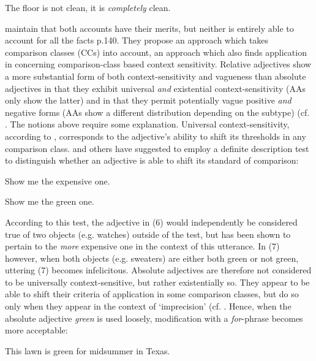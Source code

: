 \documentclass[output=paper
,modfonts
,nonflat]{langsci/langscibook}
\begin{document}
\begin{examples}
	\item The floor is not clean, it is \textit{completely} clean.
\end{examples}

\citet*{Toledo2011} maintain that both accounts have their merits, but neither is entirely able to account for all the facts p.140. They propose an approach which takes comparison classes (CCs) into account, an approach which also finds application in \citet{Burnett2017} concerning comparison-class based context sensitivity.
Relative adjectives show a more substantial form of both context-sensitivity and vagueness than absolute adjectives in that they exhibit universal \textit{and} existential context-sensitivity (AAs only show the latter) and in that they permit potentially vague positive \textit{and} negative forms (AAs show a different distribution depending on the subtype) (cf. \citet{Burnett2017}. The notions above require some explanation. Universal context-sensitivity, according to \textcite[41]{Burnett2017}, corresponds to the adjective's ability to shift its thresholds in any comparison class. \textcite[28]{Kennedy2007} and others have suggested to employ a definite description test to distinguish whether an adjective is able to shift its standard of comparison:

\begin{examples}
	\item Show me the expensive one.
	\item Show me the green one.
\end{examples}

According to this test, the adjective in (6) would independently be considered true of two objects (e.g. watches) outside of the test, but has been shown to pertain to the \textit{more} expensive one in the context of this utterance. In (7) however, when both objects (e.g. sweaters) are either both green or not green, uttering (7) becomes infelicitous. Absolute adjectives are therefore not considered to be universally context-sensitive, but rather existentially so. They appear to be able to shift their criteria of application in some comparison classes, but do so only when they appear in the context of `imprecision' (cf. \textcite[42]{Burnett2017}. Hence, when the absolute adjective \textit{green} is used loosely, modification with a \textit{for}-phrase becomes more acceptable:

\begin{examples}
	\item This lawn is green for midsummer in Texas.
\end{examples}
\end{document}
